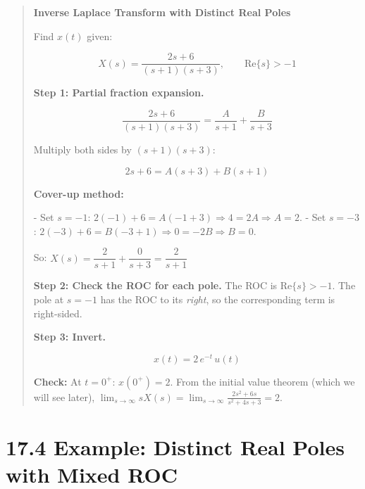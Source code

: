 \documentclass[11pt]{article}
\begin{document}
\begin{quote}
\textbf{Inverse Laplace Transform with Distinct Real Poles}

Find $x(t)$ given:

\[X(s) = \frac{2s+6}{(s+1)(s+3)}, \qquad \text{Re}\{s\} > -1\]

\textbf{Step 1: Partial fraction expansion.}

\[\frac{2s+6}{(s+1)(s+3)} = \frac{A}{s+1} + \frac{B}{s+3}\]

Multiply both sides by $(s+1)(s+3)$:

\[2s+6 = A(s+3) + B(s+1)\]

\textbf{Cover-up method:}

- Set $s = -1$: $2(-1)+6 = A(-1+3) \Rightarrow 4 = 2A \Rightarrow A = 2$.
- Set $s = -3$: $2(-3)+6 = B(-3+1) \Rightarrow 0 = -2B \Rightarrow B = 0$.

So: $X(s) = \dfrac{2}{s+1} + \dfrac{0}{s+3} = \dfrac{2}{s+1}$

\textbf{Step 2: Check the ROC for each pole.}
The ROC is $\text{Re}\{s\} > -1$. The pole at $s = -1$ has the ROC to its \textit{right}, so the corresponding term is right-sided.

\textbf{Step 3: Invert.}

\[\boxed{x(t) = 2\, e^{-t}\, u(t)}\]

\textbf{Check:} At $t = 0^+$: $x(0^+) = 2$. From the initial value theorem (which we will see later), $\lim_{s \to \infty} s X(s) = \lim_{s \to \infty} \frac{2s^2 + 6s}{s^2 + 4s + 3} = 2$. \checkmark
\end{quote}

\section*{17.4 Example: Distinct Real Poles with Mixed ROC}
\end{document}
